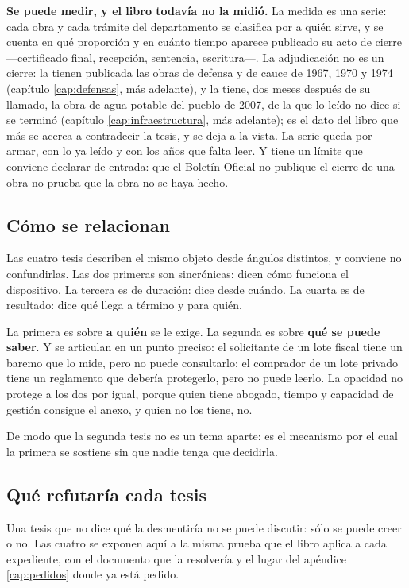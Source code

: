 \textbf{Se puede medir, y el libro todavía no la midió.} La medida es una serie: cada obra y cada trámite del departamento se clasifica por a quién sirve, y se cuenta en qué proporción y en cuánto tiempo aparece publicado su acto de cierre ---certificado final, recepción, sentencia, escritura---. La adjudicación no es un cierre: la tienen publicada las obras de defensa y de cauce de 1967, 1970 y 1974 (capítulo \ref{cap:defensas}, más adelante), y la tiene, dos meses después de su llamado, la obra de agua potable del pueblo de 2007, de la que lo leído no dice si se terminó (capítulo \ref{cap:infraestructura}, más adelante); es el dato del libro que más se acerca a contradecir la tesis, y se deja a la vista. La serie queda por armar, con lo ya leído y con los años que falta leer. Y tiene un límite que conviene declarar de entrada: que el Boletín Oficial no publique el cierre de una obra no prueba que la obra no se haya hecho.

\subsection*{Cómo se relacionan}

Las cuatro tesis describen el mismo objeto desde ángulos distintos, y conviene no confundirlas. Las dos primeras son sincrónicas: dicen cómo funciona el dispositivo. La tercera es de duración: dice desde cuándo. La cuarta es de resultado: dice qué llega a término y para quién.

La primera es sobre \textbf{a quién} se le exige. La segunda es sobre \textbf{qué se puede saber}. Y se articulan en un punto preciso: el solicitante de un lote fiscal tiene un baremo que lo mide, pero no puede consultarlo; el comprador de un lote privado tiene un reglamento que debería protegerlo, pero no puede leerlo. La opacidad no protege a los dos por igual, porque quien tiene abogado, tiempo y capacidad de gestión consigue el anexo, y quien no los tiene, no.

De modo que la segunda tesis no es un tema aparte: es el mecanismo por el cual la primera se sostiene sin que nadie tenga que decidirla.

\subsection*{Qué refutaría cada tesis}

Una tesis que no dice qué la desmentiría no se puede discutir: sólo se puede creer o no. Las cuatro se exponen aquí a la misma prueba que el libro aplica a cada expediente, con el documento que la resolvería y el lugar del apéndice \ref{cap:pedidos} donde ya está pedido.

